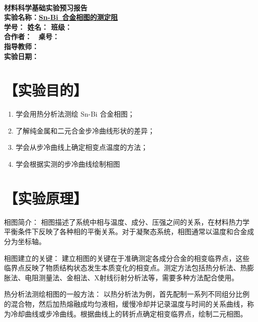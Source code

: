 \documentclass[a4paper,utf8]{article}
\begin{document}
\begin{center}
    {\mbox{}\\[7em]\bfseries\songti
    材料科学基础实验预习报告}\\[34mm]
    {\bfseries\songti
    实验名称：\uline{\hfill\mbox{Sn-Bi 合金相图的测定阻}\hfill} \\[2.9mm]
    学\quad 号：\uline{}\hfill
    姓\quad 名：\uline{}\hfill
    班\quad 级：\uline{} \\[2.9mm]
    合作者：\uline{\makebox[25mm]{}}\enspace~
    桌\quad 号：\uline{\makebox[25mm]{}}\hfill\mbox{}\\[2.9mm]
    指导教师：\uline{}\hfill\mbox{} \\[2.9mm]
    实验日期：\uline{\makebox[30mm]{}}\hfill\mbox{} \\[58.7mm]
    }
\end{center}

\newpage

\section*{【实验目的】}
    \begin{enumerate}
        \item 学会用热分析法测绘 Sn-Bi 合金相图；
        \item 了解纯金属和二元合金步冷曲线形状的差异；
        \item 学会从步冷曲线上确定相变点温度的方法；
        \item 学会根据实测的步冷曲线绘制相图
    \end{enumerate}
\section*{【实验原理】}%
相图简介： 相图描述了系统中相与温度、成分、压强之间的关系，在材料热力学平衡条件下反映了各种相的平衡关系。对于凝聚态系统，相图通常以温度和合金成分为坐标轴。

相图建立的关键： 建立相图的关键在于准确测定各成分合金的相变临界点，这些临界点反映了物质结构状态发生本质变化的相变点。测定方法包括热分析法、热膨胀法、电阻测量法、金相法、X射线衍射分析法等，需要多种方法配合使用。

热分析法测绘相图的一般方法： 以热分析法为例，首先配制一系列不同组分比例的混合物，然后加热熔融成均匀液相，缓慢冷却并记录温度与时间的关系曲线，称为冷却曲线或步冷曲线。根据曲线上的转折点确定相变临界点，绘制二元相图。
\end{document}
